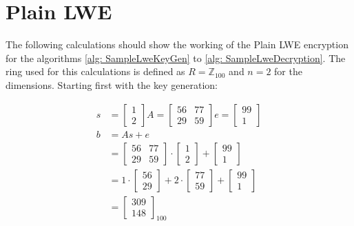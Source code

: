 \section{Plain LWE}
\label{app:PlainLweCalc}
The following calculations should show the working of the Plain LWE encryption for the algorithms \ref{alg: SampleLweKeyGen} to \ref{alg: SampleLweDecryption}. The ring used for this calculations is defined as $R=\mathbb{Z}_{100}$ and $n=2$ for the dimensions. Starting first with the key generation:


\begin{align*}
  s  & = \begin{bmatrix}1 \\ 2 \end{bmatrix}
  A  = \begin{bmatrix}56 & 77 \\ 29 & 59 \end{bmatrix}
  e  = \begin{bmatrix}99 \\ 1 \end{bmatrix}  \\
  b  & = As+e                                \\
     & = \begin{bmatrix}
           56 & 77 \\
           29 & 59
         \end{bmatrix}
  \cdot
  \begin{bmatrix}
    1 \\
    2
  \end{bmatrix}
  +
  \begin{bmatrix}
    99 \\ 
    1 
  \end{bmatrix}
  \\
     & = 1
  \cdot
  \begin{bmatrix}
    56 \\
    29
  \end{bmatrix}
  + 2 
  \cdot
  \begin{bmatrix}
    77 \\ 
    59 
  \end{bmatrix}
  + 
  \begin{bmatrix}
    99 \\ 
    1 
  \end{bmatrix}                             \\
     & = \begin{bmatrix}
           309 \\
           148\end{bmatrix}_{100}              \\

\end{align*}
